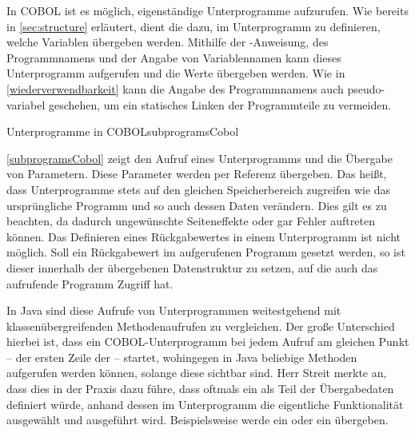 In COBOL ist es möglich, eigenständige Unterprogramme aufzurufen. Wie bereits in \autoref{sec:structure} erläutert, dient die  dazu, im Unterprogramm zu definieren, welche Variablen übergeben werden. Mithilfe der -Anweisung, des Programmnamens und der Angabe von Variablennamen kann dieses Unterprogramm aufgerufen und die Werte übergeben werden. Wie in \autoref{wiederverwendbarkeit} kann die Angabe des Programmnamens auch pseudo-variabel geschehen, um ein statisches Linken der Programmteile zu vermeiden. 

\begin{codeWithCaption}{Unterprogramme in COBOL}{subprogramsCobol}
 \cFollow
{} \cFollow
{}
\end{codeWithCaption}

\autoref{subprogramsCobol} zeigt den Aufruf eines Unterprogramms und die Übergabe von Parametern. Diese Parameter werden per Referenz übergeben. Das heißt, dass Unterprogramme stets auf den gleichen Speicherbereich zugreifen wie das ursprüngliche Programm und so auch dessen Daten verändern. Dies gilt es zu beachten, da dadurch ungewünschte Seiteneffekte oder gar Fehler auftreten können. Das Definieren eines Rückgabewertes in einem Unterprogramm ist nicht möglich. Soll ein Rückgabewert im aufgerufenen Programm gesetzt werden, so ist dieser innerhalb der übergebenen Datenstruktur zu setzen, auf die auch das aufrufende Programm Zugriff hat. 

In Java sind diese Aufrufe von Unterprogrammen weitestgehend mit klassenübergreifenden Methodenaufrufen zu vergleichen. Der große Unterschied hierbei ist, dass ein COBOL-Unterprogramm bei jedem Aufruf am gleichen Punkt -- der ersten Zeile der  -- startet, wohingegen in Java beliebige Methoden aufgerufen werden können, solange diese sichtbar sind. Herr Streit merkte an, dass dies in der Praxis dazu führe, dass oftmals ein  als Teil der Übergabedaten definiert würde, anhand dessen im Unterprogramm die eigentliche Funktionalität ausgewählt und ausgeführt wird. Beispielsweise werde ein  oder ein  übergeben.
